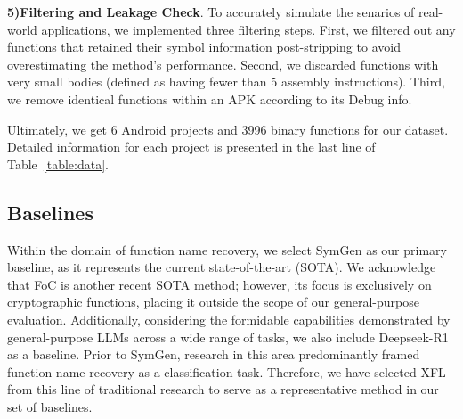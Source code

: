 \documentclass[acmsmall,screen,review,anonymous]{acmart} %
\begin{document}
\textbf{5)Filtering and Leakage Check}. To accurately simulate the senarios of real-world applications, we implemented three filtering steps. First, we filtered out any functions that retained their symbol information post-stripping to avoid overestimating the method's performance. Second, we discarded functions with very small bodies (defined as having fewer than 5 assembly instructions). Third, we remove identical functions within an APK according to its Debug info.

Ultimately, we get 6 Android projects and 3996 binary functions for our dataset. Detailed information for each project is presented in the last line of Table~\ref{table:data}.


\subsection{Baselines}
Within the domain of function name recovery, we select SymGen\cite{SymGen} as our primary baseline, as it represents the current state-of-the-art (SOTA). We acknowledge that FoC\cite{FoC} is another recent SOTA method; however, its focus is exclusively on cryptographic functions, placing it outside the scope of our general-purpose evaluation. Additionally, considering the formidable capabilities demonstrated by general-purpose LLMs across a wide range of tasks, we also include Deepseek-R1\cite{Deepseek-R1} as a baseline. Prior to SymGen\cite{SymGen}, research in this area predominantly framed function name recovery as a classification task. Therefore, we have selected XFL\cite{XFL} from this line of traditional research to serve as a representative method in our set of baselines.
\end{document}
